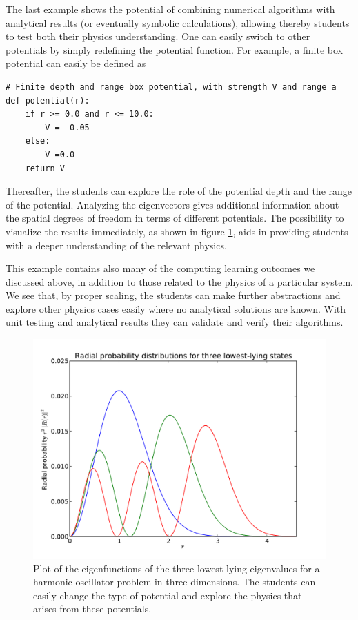 \documentclass[graybox,envcountchap,sectrefs]{svmult}
\begin{document}
The last example shows the potential of combining numerical algorithms with analytical results (or eventually symbolic calculations), allowing thereby students to test both their physics understanding. One can easily switch to other potentials by simply redefining the potential function. For example, a finite box potential can easily be defined as
\begin{lstlisting}
# Finite depth and range box potential, with strength V and range a
def potential(r):
    if r >= 0.0 and r <= 10.0:
        V = -0.05
    else:
        V =0.0
    return V
\end{lstlisting}
Thereafter, the students can explore the role of the potential depth
and the range of the potential. Analyzing the eigenvectors gives
additional information about the spatial degrees of freedom in terms
of different potentials.  The possibility to visualize the results immediately, as shown in figure \ref{fig:eigenvector}, aids in providing students with a deeper understanding of the relevant physics.

This example contains also many of the
computing learning outcomes we discussed above, in addition to those
related to the physics of a particular system. We see that, by proper
scaling, the students can make further abstractions and explore other
physics cases easily where no analytical solutions are known. With
unit testing and analytical results they can validate and verify their
algorithms.
\begin{figure}
\includegraphics[scale=0.8]{Figures/eigenvector.pdf}
\caption{Plot of the eigenfunctions of the three lowest-lying eigenvalues for a harmonic oscillator problem in three dimensions. The students can easily change the type of potential and explore the physics that arises from these potentials.}\label{fig:eigenvector}
\end{figure}
\end{document}
